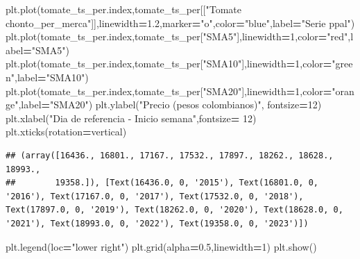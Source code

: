 \documentclass[
]{book}
\newenvironment{Shaded}{\begin{snugshade}}{\end{snugshade}}
\newcommand{\DecValTok}[1]{\textcolor[rgb]{0.00,0.00,0.81}{#1}}
\newcommand{\FloatTok}[1]{\textcolor[rgb]{0.00,0.00,0.81}{#1}}
\newcommand{\NormalTok}[1]{#1}
\newcommand{\OperatorTok}[1]{\textcolor[rgb]{0.81,0.36,0.00}{\textbf{#1}}}
\newcommand{\StringTok}[1]{\textcolor[rgb]{0.31,0.60,0.02}{#1}}
\begin{document}
\begin{Shaded}
\begin{Highlighting}[]

\NormalTok{plt.plot(tomate\_ts\_per.index,tomate\_ts\_per[[}\StringTok{"Tomate chonto\_per\_merca"}\NormalTok{]],linewidth}\OperatorTok{=}\FloatTok{1.2}\NormalTok{,marker}\OperatorTok{=}\StringTok{"o"}\NormalTok{,color}\OperatorTok{=}\StringTok{"blue"}\NormalTok{,label}\OperatorTok{=}\StringTok{"Serie ppal"}\NormalTok{)}
\NormalTok{plt.plot(tomate\_ts\_per.index,tomate\_ts\_per[}\StringTok{"SMA5"}\NormalTok{],linewidth}\OperatorTok{=}\DecValTok{1}\NormalTok{,color}\OperatorTok{=}\StringTok{"red"}\NormalTok{,label}\OperatorTok{=}\StringTok{"SMA5"}\NormalTok{)}
\NormalTok{plt.plot(tomate\_ts\_per.index,tomate\_ts\_per[}\StringTok{"SMA10"}\NormalTok{],linewidth}\OperatorTok{=}\DecValTok{1}\NormalTok{,color}\OperatorTok{=}\StringTok{"green"}\NormalTok{,label}\OperatorTok{=}\StringTok{"SMA10"}\NormalTok{)}
\NormalTok{plt.plot(tomate\_ts\_per.index,tomate\_ts\_per[}\StringTok{"SMA20"}\NormalTok{],linewidth}\OperatorTok{=}\DecValTok{1}\NormalTok{,color}\OperatorTok{=}\StringTok{"orange"}\NormalTok{,label}\OperatorTok{=}\StringTok{"SMA20"}\NormalTok{)}
\NormalTok{plt.ylabel(}\StringTok{"Precio (pesos colombianos)"}\NormalTok{, fontsize}\OperatorTok{=}\DecValTok{12}\NormalTok{)}
\NormalTok{plt.xlabel(}\StringTok{"Dia de referencia {-} Inicio semana"}\NormalTok{,fontsize}\OperatorTok{=} \DecValTok{12}\NormalTok{)}
\NormalTok{plt.xticks(rotation}\OperatorTok{=}\StringTok{\textquotesingle{}vertical\textquotesingle{}}\NormalTok{)}
\end{Highlighting}
\end{Shaded}

\begin{verbatim}
## (array([16436., 16801., 17167., 17532., 17897., 18262., 18628., 18993.,
##        19358.]), [Text(16436.0, 0, '2015'), Text(16801.0, 0, '2016'), Text(17167.0, 0, '2017'), Text(17532.0, 0, '2018'), Text(17897.0, 0, '2019'), Text(18262.0, 0, '2020'), Text(18628.0, 0, '2021'), Text(18993.0, 0, '2022'), Text(19358.0, 0, '2023')])
\end{verbatim}

\begin{Shaded}
\begin{Highlighting}[]
\NormalTok{plt.legend(loc}\OperatorTok{=}\StringTok{"lower right"}\NormalTok{)}
\NormalTok{plt.grid(alpha}\OperatorTok{=}\FloatTok{0.5}\NormalTok{,linewidth}\OperatorTok{=}\DecValTok{1}\NormalTok{)}
\NormalTok{plt.show()}
\end{Highlighting}
\end{Shaded}
\end{document}
